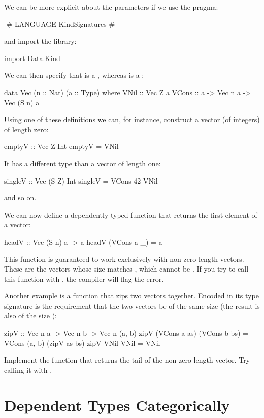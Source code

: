 \documentclass[DaoFP]{subfiles}
\begin{document}
We can be more explicit about the parameters if we use the pragma:
\begin{haskell}
{-# LANGUAGE KindSignatures #-}
\end{haskell}
and import the library:
\begin{haskell}
import Data.Kind
\end{haskell}
We can then specify that  is a , whereas  is a :
\begin{haskell}
data Vec (n :: Nat) (a :: Type) where
    VNil  :: Vec Z a
    VCons :: a -> Vec n a -> Vec (S n) a
\end{haskell}

Using one of these definitions we can, for instance, construct a vector (of integers) of length zero:
\begin{haskell}
emptyV :: Vec Z Int
emptyV = VNil
\end{haskell}
It has a different type than a vector of length one:
\begin{haskell}
singleV :: Vec (S Z) Int
singleV = VCons 42 VNil
\end{haskell}
and so on.

We can now define a dependently typed function that returns the first element of a vector:
\begin{haskell}
headV :: Vec (S n) a -> a
headV (VCons a _) = a
\end{haskell}
This function is guaranteed to work exclusively with non-zero-length vectors. These are the vectors whose size matches , which cannot be . If you try to call this function with , the compiler will flag the error.

Another example is a function that zips two vectors together. Encoded in its type signature is the requirement that the two vectors be of the same size  (the result is also of the size ):
\begin{haskell}
zipV :: Vec n a -> Vec n b -> Vec n (a, b)
zipV (VCons a as) (VCons b bs) = VCons (a, b) (zipV as bs)
zipV VNil VNil = VNil
\end{haskell}

\begin{exercise}
Implement the function  that returns the tail of the non-zero-length vector. Try calling it with .
\end{exercise}

\section{Dependent Types Categorically}
\end{document}
